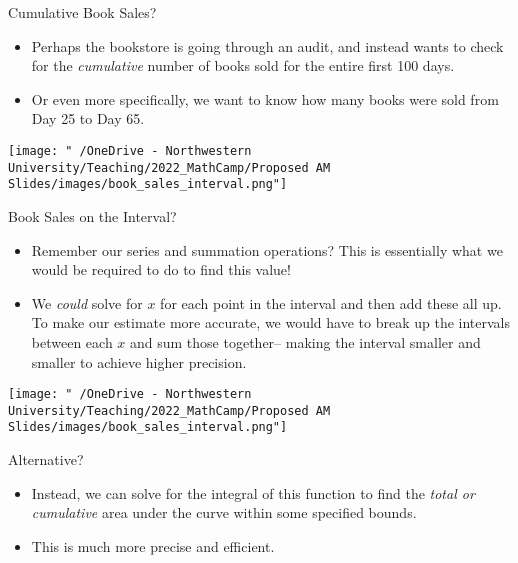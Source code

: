 \documentclass[
  ignorenonframetext,
]{beamer}
\begin{document}
\begin{frame}{Cumulative Book Sales?}
\protect\hypertarget{cumulative-book-sales}{}
\begin{itemize}
\item
  Perhaps the bookstore is going through an audit, and instead wants to
  check for the \emph{cumulative} number of books sold for the entire
  first 100 days.
\item
  Or even more specifically, we want to know how many books were sold
  from Day 25 to Day 65.
\end{itemize}

\centering

\texttt{[image: "~/OneDrive - Northwestern University/Teaching/2022\_MathCamp/Proposed AM Slides/images/book\_sales\_interval.png"]}
\end{frame}

\begin{frame}{Book Sales on the Interval?}
\protect\hypertarget{book-sales-on-the-interval}{}
\footnotesize

\begin{itemize}
\item
  Remember our series and summation operations? This is essentially what
  we would be required to do to find this value!
\item
  We \emph{could} solve for \(x\) for each point in the interval and
  then add these all up. To make our estimate more accurate, we would
  have to break up the intervals between each \(x\) and sum those
  together-- making the interval smaller and smaller to achieve higher
  precision.
\end{itemize}

\centering

\texttt{[image: "~/OneDrive - Northwestern University/Teaching/2022\_MathCamp/Proposed AM Slides/images/book\_sales\_interval.png"]}
\end{frame}

\begin{frame}{Alternative?}
\protect\hypertarget{alternative}{}
\begin{itemize}
\item
  Instead, we can solve for the integral of this function to find the
  \emph{total or cumulative} area under the curve within some specified
  bounds.
\item
  This is much more precise and efficient.
\end{itemize}
\end{frame}
\end{document}
